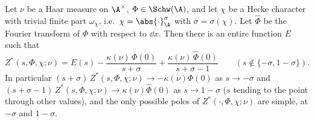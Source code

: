 Let $\nu$ be a Haar measure on $\A^\times$, $\Phi\in\Schw(\A)$, and let $\chi$ be a Hecke character with trivial finite
part $\omega_\chi$, i.e.\ $\chi=\abs{\cdot}_\A^{\sigma}$ with $\sigma=\sigma(\chi)$. Let $\hat\Phi$ be the Fourier
transform of $\Phi$ with respect to $\dd x$. Then there is an entire function $E$ such that
\[
  Z^*(s,\Phi,\chi;\nu)=E(s)-\frac{\kappa(\nu)\,\Phi(0)}{s+\sigma}+\frac{\kappa(\nu)\,\hat\Phi(0)}{s+\sigma-1}
  \qquad(s\notin\{-\sigma,1-\sigma\}).
\]
In particular $(s+\sigma)\,Z^*(s,\Phi,\chi;\nu)\to-\kappa(\nu)\Phi(0)$ as $s\to-\sigma$ and
$(s+\sigma-1)\,Z^*(s,\Phi,\chi;\nu)\to\kappa(\nu)\hat\Phi(0)$ as $s\to1-\sigma$ ($s$ tending to the point through
other values), and the only possible poles of $Z^*(\cdot,\Phi,\chi;\nu)$ are simple, at $-\sigma$ and $1-\sigma$.
